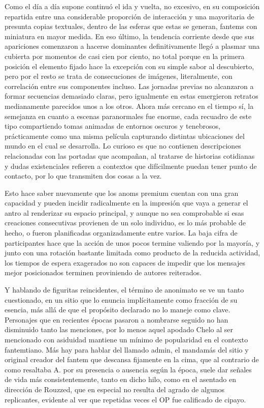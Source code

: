 \documentclass[
]{book}
\begin{document}
Como el día a día supone continuó el ida y vuelta, no excesivo, en su composición repartida entre una considerable proporción de interacción y una mayoritaria de presunta copias textuales, dentro de las esferas que estas se generan, fantems con miniatura en mayor medida. En eso último, la tendencia corriente desde que sus apariciones comenzaron a hacerse dominantes definitivamente llegó a plasmar una cubierta por momentos de casi cien por ciento, no total porque en la primera posición el elemento fijado hace la excepción con su simple sabor al descubierto, pero por el resto se trata de consecuciones de imágenes, literalmente, con correlación entre sus componentes incluso. Las jornadas previas no alcanzaron a formar secuencias demasiado claras, pero igualmente en estas emergieron retratos medianamente parecidos unos a los otros. Ahora más cercano en el tiempo sí, la semejanza en cuanto a escenas paranormales fue enorme, cada recuadro de este tipo compartiendo tomas animadas de entornos oscuros y tenebrosos, prácticamente como una misma película capturando distintas ubicaciones del mundo en el cual se desarrolla. Lo curioso es que no contienen descripciones relacionadas con las portadas que acompañan, al tratarse de historias cotidianas y dudas existenciales refieren a contextos que difícilmente puedan tener punto de contacto, por lo que transmiten dos cosas a la vez.

Esto hace saber nuevamente que los anoms premium cuentan con una gran capacidad y pueden incidir radicalmente en la impresión que vaya a generar el antro al renderizar su espacio principal, y aunque no sea comprobable si esas creaciones consecutivas provienen de un solo individuo, es lo más probable de hecho, o fueron planificadas organizadamente entre varios. La baja cifra de participantes hace que la acción de unos pocos termine valiendo por la mayoría, y junto con una rotación bastante limitada como producto de la reducida actividad, los tiempos de espera exagerados no son capaces de impedir que los mensajes mejor posicionados terminen proviniendo de autores reiterados.

Y hablando de figuritas reincidentes, el término de anonimato se ve un tanto cuestionado, en un sitio que lo enuncia implícitamente como fracción de su esencia, más allá de que el propósito declarado no lo maneje como clave. Personajes que en recientes épocas pasaron a nombrarse seguido no han disminuido tanto las menciones, por lo menos aquel apodado Chelo al ser mencionado con asiduidad mantiene un mínimo de popularidad en el contexto fantemtiano. Más hay para hablar del llamado admin, el mandamás del sitio y original creador del fantem que descansa fijamente en la cima, que al contrario de como resaltaba A. por su presencia o ausencia según la época, suele dar señales de vida más consistentemente, tanto en dicho hilo, como en el asentado en dirección de Rouzzed, que en especial no resulta del agrado de algunos replicantes, evidente al ver que repetidas veces el OP fue calificado de cipayo.
\end{document}
